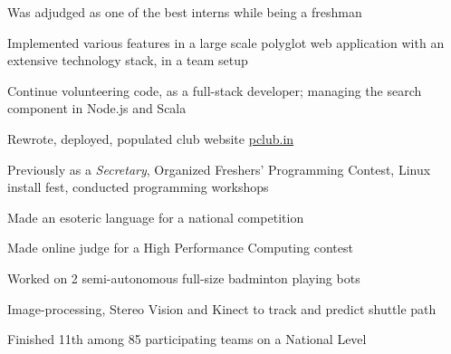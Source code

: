 \documentclass[a4paper]{deedy-resume} %
\begin{document}
\begin{minipage}[t]{0.66\textwidth}
  \sectionspace

  \runsubsection{}

  \begin{tightitemize}
  \item Was adjudged as one of the best interns while being a freshman
  \item Implemented various features in a large scale polyglot web
    application with an extensive technology stack, in a team setup
  \item Continue volunteering code, as a full-stack developer;
    managing the search component in Node.js and Scala
  \end{tightitemize}

  \sectionspace

  \runsubsection{}
  \begin{tightitemize}
  \item Rewrote, deployed, populated club website \href{https://pclub.in}{pclub.in}
  \item Previously as a \textit{Secretary}, Organized Freshers'
    Programming Contest, Linux install fest, conducted
    programming workshops
  \end{tightitemize}

  \sectionspace

  \runsubsection{}
  \begin{tightitemize}
  \item Made an esoteric language for a national
    competition
  \item Made online judge for a High Performance Computing contest
  \end{tightitemize}


  \sectionspace

  \runsubsection{}
  \begin{tightitemize}
  \item Worked on 2 semi-autonomous full-size badminton playing bots
  \item Image-processing, Stereo Vision and Kinect to track and
    predict shuttle path
  \item Finished 11th among 85 participating teams on a National Level
  \end{tightitemize}


\end{minipage}
\end{document}
